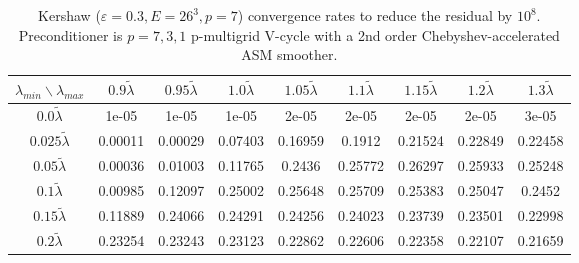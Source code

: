 \begin{table}
\centering
\begin{tabular}{||c| c c c c c c c c||}
  \hline
  $\lambda_{min}\backslash \lambda_{max}$ & $0.9 \tilde\lambda$ & $0.95 \tilde\lambda$ & $1.0 \tilde\lambda$ & $1.05 \tilde\lambda$ & $1.1 \tilde\lambda$ & $1.15 \tilde\lambda$ & $1.2 \tilde\lambda$ & $1.3 \tilde\lambda$  \\ 
\hline\hline
$0.0 \tilde\lambda$ & 1e-05 & 1e-05 & 1e-05 & 2e-05 & 2e-05 & 2e-05 & 2e-05 & 3e-05 \\ 
$0.025 \tilde\lambda$ & 0.00011 & 0.00029 & 0.07403 & 0.16959 & 0.1912 & 0.21524 & 0.22849 & 0.22458 \\ 
$0.05 \tilde\lambda$ & 0.00036 & 0.01003 & 0.11765 & 0.2436 & 0.25772 & 0.26297 & 0.25933 & 0.25248 \\ 
$0.1 \tilde\lambda$ & 0.00985 & 0.12097 & 0.25002 & 0.25648 & 0.25709 & 0.25383 & 0.25047 & 0.2452 \\ 
$0.15 \tilde\lambda$ & 0.11889 & 0.24066 & 0.24291 & 0.24256 & 0.24023 & 0.23739 & 0.23501 & 0.22998 \\ 
$0.2 \tilde\lambda$ & 0.23254 & 0.23243 & 0.23123 & 0.22862 & 0.22606 & 0.22358 & 0.22107 & 0.21659 \\ 
\hline
\end{tabular}
\caption{
  Kershaw ($\varepsilon=0.3, E=26^3, p=7$) convergence rates to reduce the residual by $10^8$.
  Preconditioner is $p=7,3,1$ p-multigrid V-cycle with a 2nd order Chebyshev-accelerated ASM smoother.
  \label{table:kershaw-eig-multiplier-conv-0.3}}
\end{table}
